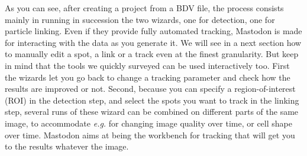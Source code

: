 As you can see, after creating a project from a BDV file, the process consists mainly in running in succession the two wizards, one for detection, one for particle linking. 
Even if they provide fully automated tracking, Mastodon is made for interacting with the data as you generate it. 
We will see in a next section how to manually edit a spot, a link or a track even at the finest granularity.
But keep in mind that the tools we quickly surveyed can be used interactively too. 
First the wizards let you go back to change a tracking parameter and check how the results are improved or not. 
Second, because you can specify a region-of-interest (ROI) in the detection step, and select the spots you want to track in the linking step, several runs of these wizard can be combined on different parts of the same image, to accommodate \textit{e.g.} for changing image quality over time, or cell shape over time. 
Mastodon aims at being the workbench for tracking that will get you to the results whatever the image.
